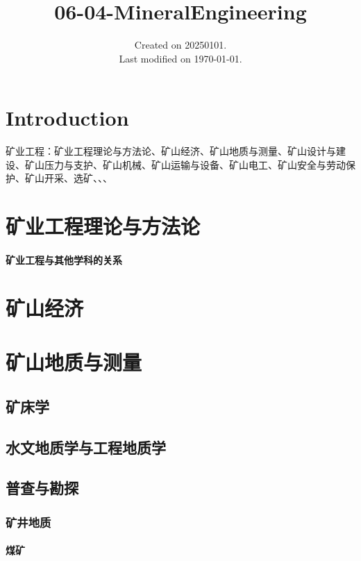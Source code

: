 \documentclass[UTF8]{../../ApplicationUniverse}
\begin{document}
\title{06-04-MineralEngineering}
\date{Created on 20250101.\\   Last modified on \today.}
\maketitle
\tableofcontents


\chapter{Introduction}

矿业工程：矿业工程理论与方法论、矿山经济、矿山地质与测量、矿山设计与建设、矿山压力与支护、矿山机械、矿山运输与设备、矿山电工、矿山安全与劳动保护、矿山开采、选矿、、、


\chapter{矿业工程理论与方法论}
\subsubsection{矿业工程与其他学科的关系}







\chapter{矿山经济}





\chapter{矿山地质与测量}
\section{矿床学}
\section{水文地质学与工程地质学}
\section{普查与勘探}
    \subsection{矿井地质}
        \subsubsection{煤矿}
\end{document}
